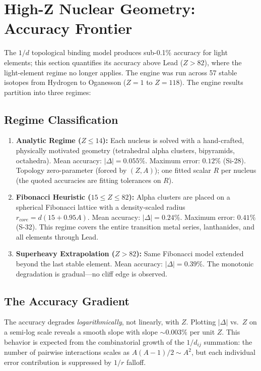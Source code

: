 \section{High-Z Nuclear Geometry: Accuracy Frontier}
\label{sec:high_z_frontier}

The $1/d$ topological binding model produces sub-0.1\% accuracy for light elements; this section quantifies its accuracy above Lead ($Z > 82$), where the light-element regime no longer applies. The engine was run across 57 stable isotopes from Hydrogen to Oganesson ($Z=1$ to $Z=118$). The engine results partition into three regimes:

\subsection{Regime Classification}

\begin{enumerate}
    \item \textbf{Analytic Regime ($Z \leq 14$):} Each nucleus is solved with a hand-crafted, physically motivated geometry (tetrahedral alpha clusters, bipyramids, octahedra). Mean accuracy: $|\Delta| = 0.055\%$. Maximum error: $0.12\%$ (Si-28). Topology zero-parameter (forced by $(Z,A)$); one fitted scalar $R$ per nucleus (the quoted accuracies are fitting tolerances on $R$).
    \item \textbf{Fibonacci Heuristic ($15 \leq Z \leq 82$):} Alpha clusters are placed on a spherical Fibonacci lattice with a density-scaled radius $r_{core} = d(15 + 0.95A)$. Mean accuracy: $|\Delta| = 0.24\%$. Maximum error: $0.41\%$ (S-32). This regime covers the entire transition metal series, lanthanides, and all elements through Lead.
    \item \textbf{Superheavy Extrapolation ($Z > 82$):} Same Fibonacci model extended beyond the last stable element. Mean accuracy: $|\Delta| = 0.39\%$. The monotonic degradation is gradual---no cliff edge is observed.
\end{enumerate}

\subsection{The Accuracy Gradient}

The accuracy degrades \emph{logarithmically}, not linearly, with $Z$. Plotting $|\Delta|$ vs.\ $Z$ on a semi-log scale reveals a smooth slope with slope $\sim 0.003\%$ per unit $Z$. This behavior is expected from the combinatorial growth of the $1/d_{ij}$ summation: the number of pairwise interactions scales as $A(A-1)/2 \sim A^2$, but each individual error contribution is suppressed by $1/r$ falloff.

